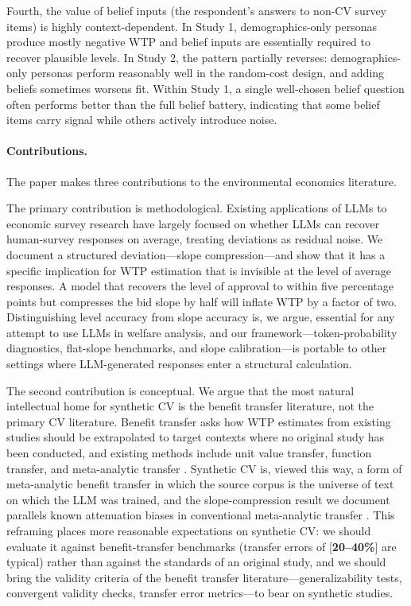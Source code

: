 \documentclass[12pt]{article}
\begin{document}
Fourth, the value of belief inputs (the respondent's answers to non-CV survey items) is highly context-dependent. In Study 1, demographics-only personas produce mostly negative WTP and belief inputs are essentially required to recover plausible levels. In Study 2, the pattern partially reverses: demographics-only personas perform reasonably well in the random-cost design, and adding beliefs sometimes worsens fit. Within Study 1, a single well-chosen belief question often performs better than the full belief battery, indicating that some belief items carry signal while others actively introduce noise.

\paragraph{Contributions.} The paper makes three contributions to the environmental economics literature.

The primary contribution is methodological. Existing applications of LLMs to economic survey research \parencite{Brand2024, Horton2023, Aher2023} have largely focused on whether LLMs can recover human-survey responses on average, treating deviations as residual noise. We document a structured deviation---slope compression---and show that it has a specific implication for WTP estimation that is invisible at the level of average responses. A model that recovers the level of approval to within five percentage points but compresses the bid slope by half will inflate WTP by a factor of two. Distinguishing level accuracy from slope accuracy is, we argue, essential for any attempt to use LLMs in welfare analysis, and our framework---token-probability diagnostics, flat-slope benchmarks, and slope calibration---is portable to other settings where LLM-generated responses enter a structural calculation.

The second contribution is conceptual. We argue that the most natural intellectual home for synthetic CV is the benefit transfer literature, not the primary CV literature. Benefit transfer asks how WTP estimates from existing studies should be extrapolated to target contexts where no original study has been conducted, and existing methods include unit value transfer, function transfer, and meta-analytic transfer \parencite{Rosenberger2017, Loomis2015, Boyle2010}. Synthetic CV is, viewed this way, a form of meta-analytic benefit transfer in which the source corpus is the universe of text on which the LLM was trained, and the slope-compression result we document parallels known attenuation biases in conventional meta-analytic transfer \parencite{Bergstrom2008}. This reframing places more reasonable expectations on synthetic CV: we should evaluate it against benefit-transfer benchmarks (transfer errors of [\textbf{20--40\%}] are typical) rather than against the standards of an original study, and we should bring the validity criteria of the benefit transfer literature---generalizability tests, convergent validity checks, transfer error metrics---to bear on synthetic studies.
\end{document}

